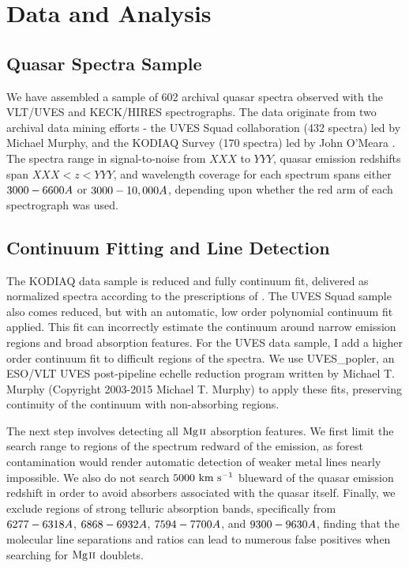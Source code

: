\documentclass[iop,apj,numberedappendix,appendixfloats,twocolappendix]{emulateapj}
\begin{document}

\section{Data and Analysis}
\label{sec:data}

\subsection{Quasar Spectra Sample}

We have assembled a sample of 602 archival quasar spectra observed with the VLT/UVES and KECK/HIRES spectrographs. The data originate from two archival data mining efforts - the UVES Squad collaboration (432 spectra) led by Michael Murphy, and the KODIAQ Survey (170 spectra) led by John O'Meara \citep{OMeara2015}. The spectra range in signal-to-noise from $XXX$ to $YYY$, quasar emission redshifts span $XXX < z < YYY$, and wavelength coverage for each spectrum spans either $3000 - 6600\AA$ or $3000 - 10,000\AA$, depending upon whether the red arm of each spectrograph was used.


\subsection{Continuum Fitting and Line Detection}
\label{sec:detection}

The KODIAQ data sample is reduced and fully continuum fit, delivered as normalized spectra according to the prescriptions of \cite{OMeara2015}. The UVES Squad sample also comes reduced, but with an automatic, low order polynomial continuum fit applied. This fit can incorrectly estimate the continuum around narrow emission regions and broad absorption features. For the UVES data sample, I add a higher order continuum fit to difficult regions of the spectra. We use UVES\_popler, an ESO/VLT UVES post-pipeline echelle reduction program written by Michael T. Murphy (Copyright 2003-2015 Michael T. Murphy) to apply these fits, preserving continuity of the continuum with non-absorbing regions. 

The next step involves detecting all ${\hbox{{\rm Mg}\kern 0.1em{\sc ii}}}$ absorption features. We first limit the search range to regions of the spectrum redward of the {\Lya} emission, as {\Lya} forest contamination would render automatic detection of weaker metal lines nearly impossible. We also do not search $5000~\hbox{km~s$^{-1}$}$ blueward of the quasar emission redshift in order to avoid absorbers associated with the quasar itself. Finally, we exclude regions of strong telluric absorption bands, specifically from $6277 - 6318 \AA$, $6868 - 6932 \AA$, $7594 - 7700 \AA$, and $9300 - 9630 \AA$, finding that the molecular line separations and ratios can lead to numerous false positives when searching for ${\hbox{{\rm Mg}\kern 0.1em{\sc ii}}}$ doublets. 
\end{document}
